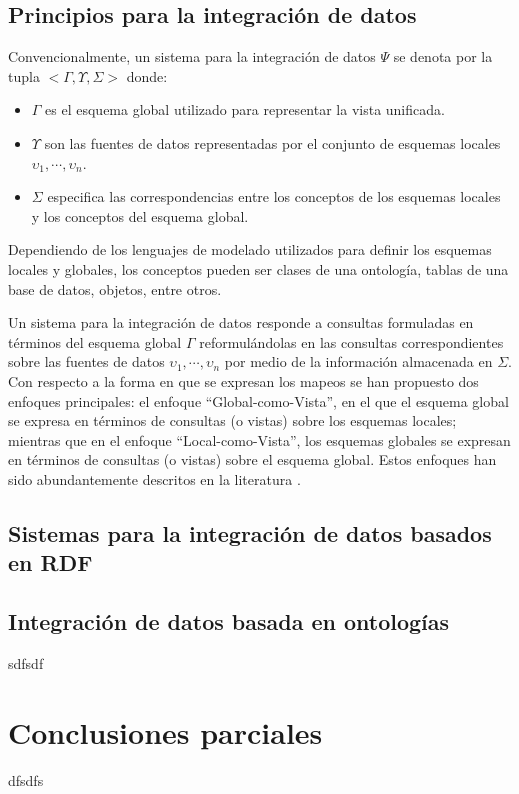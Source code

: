 \subsection{Principios para la integración de datos}
Convencionalmente, un sistema para la integración de datos $\Psi$ se denota por la tupla $<\Gamma , \Upsilon , \Sigma>$ donde:

\begin{itemize}
\item $\Gamma$ es el esquema global utilizado para representar la vista unificada.
\item $\Upsilon$ son las fuentes de datos representadas por el conjunto de esquemas locales $\upsilon_1 , \cdots , \upsilon_n$.
\item $\Sigma$ especifica las correspondencias entre los conceptos de los esquemas locales y los conceptos del esquema global.
\end{itemize}

Dependiendo de los lenguajes de modelado utilizados para definir los esquemas locales y globales, los conceptos pueden ser clases de una ontología, tablas de una base de datos, objetos, entre otros.

Un sistema para la integración de datos responde a consultas formuladas en términos del esquema global $\Gamma$ reformulándolas en las consultas correspondientes sobre las fuentes de datos $\upsilon_1 , \cdots , \upsilon_n$ por medio de la información almacenada en $\Sigma$. Con respecto a la forma en que se expresan los mapeos se han propuesto dos enfoques principales: el enfoque ``Global-como-Vista'', en el que el esquema global se expresa en términos de consultas (o vistas) sobre los esquemas locales; mientras que en el enfoque ``Local-como-Vista'', los esquemas globales se expresan en términos de consultas (o vistas) sobre el esquema global. Estos enfoques han sido abundantemente descritos en la literatura \citep{Doan:2012:PDI:2401764,Lenzerini:2002:DIT:543613.543644}.

\subsection{Sistemas para la integración de datos basados en RDF}


\subsection{Integración de datos basada en ontologías}
sdfsdf

\section{Conclusiones parciales}
dfsdfs








